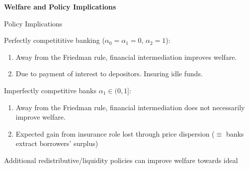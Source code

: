 \documentclass[10pt,english,slidetop,compress,
              blue,mathserif,color=option]{beamer}
\theoremstyle{plain}
\theoremstyle{definition}
\begin{document}
{
  \begin{frame}
    \begin{center}
      \bigskip
      \bigskip

      {\Huge\bfseries{\color{orange}
        Welfare and Policy Implications
        }
      }
      \bigskip

    \end{center}
  \end{frame}
}

\begin{frame}[allowframebreaks]{Policy Implications}

    Perfectly competititive banking ($\alpha_0 = \alpha_1 = 0$, $\alpha_2 = 1$):

    \begin{enumerate}
      \item Away from the Friedman rule, financial intermediation improves welfare.
      \item Due to payment of interest to depositors. Insuring idle funds.
    \end{enumerate}

    \bigskip

    Imperfectly competitive banks $\alpha_1 \in (0,1]$:
    \begin{enumerate}
      \item Away from the Friedman rule, financial intermediation does not necessarily improve welfare.
      \item Expected gain from insurance role lost through price dispersion ($\equiv$ banks extract borrowers' surplus)
    \end{enumerate}

    \bigskip

    Additional redistributive/liquidity policies can improve welfare towards \citet{Berentsen2007} ideal





\end{frame}
\end{document}
